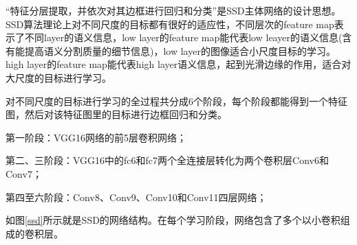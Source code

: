 “特征分层提取，并依次对其边框进行回归和分类”是SSD主体网络的设计思想。SSD算法理论上对不同尺度的目标都有很好的适应性，不同层次的feature map表示了不同layer的语义信息，low layer的feature map能代表low leayer的语义信息(含有能提高语义分割质量的细节信息)，low layer的图像适合小尺度目标的学习。high layer的feature map能代表high layer语义信息，起到光滑边缘的作用，适合对大尺度的目标进行学习。

对不同尺度的目标进行学习的全过程共分成6个阶段，每个阶段都能得到一个特征图，然后对该特征图里的目标进行边框回归和分类。

第一阶段：VGG16\cite{vgg16}网络的前5层卷积网络；

第二、三阶段：VGG16中的fc6和fc7两个全连接层转化为两个卷积层Conv6和Conv7；

第四至六阶段：Conv8、Conv9、Conv10和Conv11四层网络；

如图\ref{ssd}所示就是SSD的网络结构。在每个学习阶段，网络包含了多个以小卷积组成的卷积层。


